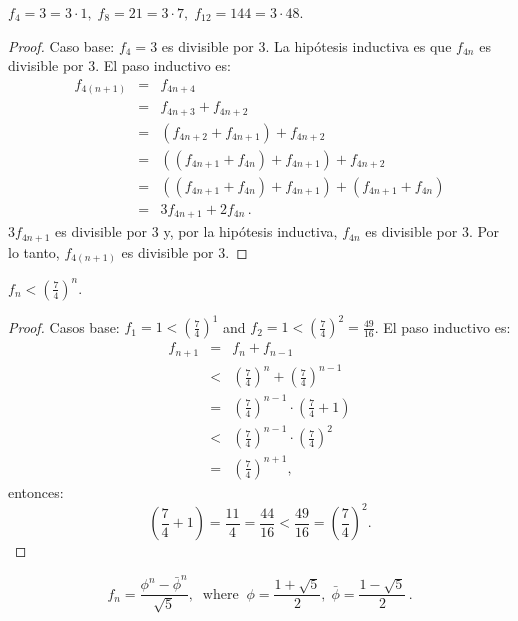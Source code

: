 \begin{example}
$f_4=3=3\cdot 1,\; f_8=21=3\cdot 7,\; f_{12}=144=3\cdot 48$.
\end{example}

\begin{proof}
Caso base: $f_4=3$ es divisible por $3$. La hipótesis inductiva es que $f_{4n}$ es divisible por $3$. El paso inductivo es:
\begin{eqnarray*}
f_{4(n+1)} &=& f_{4n+4}\\
&=& f_{4n+3}+f_{4n+2}\\
&=& (f_{4n+2}+f_{4n+1})+f_{4n+2}\\
&=& ((f_{4n+1}+f_{4n})+f_{4n+1})+f_{4n+2}\\
&=& ((f_{4n+1}+f_{4n})+f_{4n+1})+(f_{4n+1}+f_{4n})\\
&=& 3f_{4n+1}+2f_{4n}\,.
\end{eqnarray*}
$3f_{4n+1}$ es divisible por $3$ y, por la hipótesis inductiva, $f_{4n}$ es divisible por $3$. Por lo tanto, $f_{4(n+1)}$ es divisible por $3$.
\end{proof}

\begin{theorem}\label{thm.seven-fourths}
$f_n < \left(\displaystyle\frac{7}{4}\right)^n$.
\end{theorem}

\begin{proof}
Casos base: $f_1=1<\left(\displaystyle\frac{7}{4}\right)^1$ and $f_2=1<\left(\displaystyle\frac{7}{4}\right)^2=\displaystyle\frac{49}{16}$. El paso inductivo es:
\begin{eqnarray*}
f_{n+1}&=&f_n+f_{n-1}\\
&<&\left(\frac{7}{4}\right)^n + \left(\frac{7}{4}\right)^{n-1}\\
&=&\left(\frac{7}{4}\right)^{n-1}\cdot\left(\frac{7}{4}+1\right)\\
&<&\left(\frac{7}{4}\right)^{n-1}\cdot\left(\frac{7}{4}\right)^2\\
&=&\left(\frac{7}{4}\right)^{n+1},
\end{eqnarray*}
entonces:
\[
\left(\frac{7}{4}+1\right) = \frac{11}{4} = \frac{44}{16}<\frac{49}{16}=\left(\frac{7}{4}\right)^2.
\]
\end{proof}


\begin{theorem}

\begin{displaymath}
f_n = \frac{\phi^n - \bar{\phi}^n}{\sqrt{5}}, \;\; \mathrm{where} \;\;
\phi = \frac{1+\sqrt{5}}{2},\;\bar{\phi} = \frac{1-\sqrt{5}}{2}\,.
\end{displaymath}
\end{theorem}

